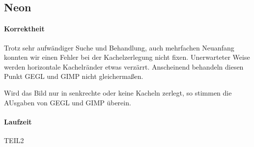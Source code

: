 \subsection{Neon}
\paragraph{Korrektheit}
\label{paragraph:neon_korrektheit}
Trotz sehr aufwändiger Suche und Behandlung, auch mehrfachen Neuanfang konnten wir einen Fehler bei der Kachelzerlegung nicht fixen.  
Unerwarteter Weise werden horizontale Kachelränder etwas verzärrt.
Anscheinend behandeln diesen Punkt GEGL und GIMP nicht gleichermaßen.

Wird das Bild nur in senkrechte oder keine Kacheln zerlegt, so stimmen die AUsgaben von GEGL und GIMP überein.
\paragraph{Laufzeit}

TEIL2
